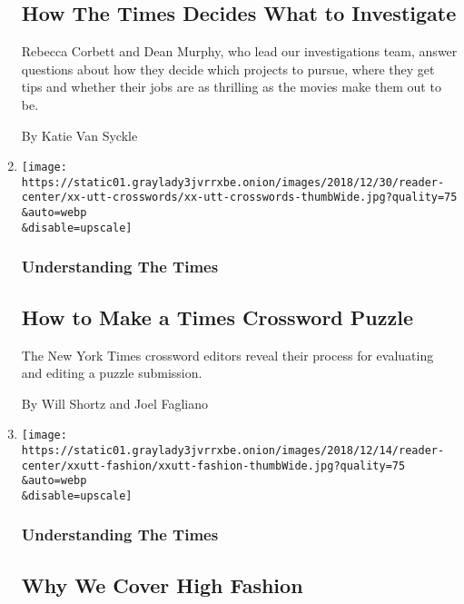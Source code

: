 \begin{enumerate}
{  \subsection{How The Times Decides What to
  Investigate}\label{how-the-times-decides-what-to-investigate}}

  Rebecca Corbett and Dean Murphy, who lead our investigations team,
  answer questions about how they decide which projects to pursue, where
  they get tips and whether their jobs are as thrilling as the movies
  make them out to be.

  By Katie Van Syckle
\item
  \href{/2018/12/18/reader-center/crossword-puzzle-explainer.html}{}

  \texttt{[image: https://static01.graylady3jvrrxbe.onion/images/2018/12/30/reader-center/xx-utt-crosswords/xx-utt-crosswords-thumbWide.jpg?quality=75\\\&auto=webp\\\&disable=upscale]}

  \hypertarget{understanding-the-times-8}{%
  \subsubsection{Understanding The
  Times}\label{understanding-the-times-8}}

  \hypertarget{how-to-make-a-times-crossword-puzzle}{%
  \subsection{How to Make a Times Crossword
  Puzzle}\label{how-to-make-a-times-crossword-puzzle}}

  The New York Times crossword editors reveal their process for
  evaluating and editing a puzzle submission.

  By Will Shortz and Joel Fagliano
\item
  \href{/2018/12/17/reader-center/why-we-cover-high-fashion.html}{}

  \texttt{[image: https://static01.graylady3jvrrxbe.onion/images/2018/12/14/reader-center/xxutt-fashion/xxutt-fashion-thumbWide.jpg?quality=75\\\&auto=webp\\\&disable=upscale]}

  \hypertarget{understanding-the-times-9}{%
  \subsubsection{Understanding The
  Times}\label{understanding-the-times-9}}

  \hypertarget{why-we-cover-high-fashion}{%
  \subsection{Why We Cover High
  Fashion}\label{why-we-cover-high-fashion}}


\end{enumerate}
